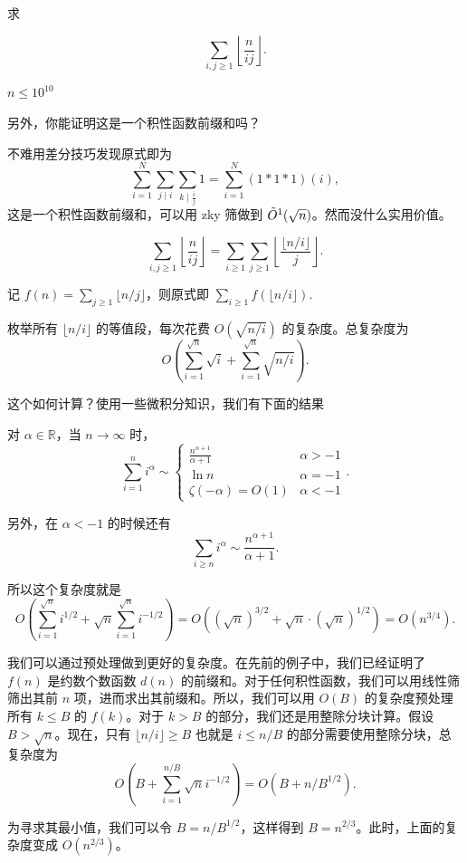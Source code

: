\begin{example}[整除分块的嵌套]
    求

    $$
    \sum_{i,j\ge 1}\left\lfloor\frac{n}{ij}\right\rfloor.
    $$

    $n\le 10^{10}$

    另外，你能证明这是一个积性函数前缀和吗？
\end{example}
\begin{remark}
    不难用差分技巧发现原式即为
    $$
    \sum_{i=1}^N\sum_{j\mid i}\sum_{k\mid \frac{i}{j}}1=\sum_{i=1}^N (1\ast 1\ast 1)(i),
    $$
    这是一个积性函数前缀和，可以用 zky 筛做到 $\tilde O\footnotemark(\sqrt{n})$。然而没什么实用价值。
\end{remark}
\begin{solution}
    $$
    \sum_{i,j\ge 1}\left\lfloor\frac{n}{ij}\right\rfloor=\sum_{i\ge 1}\sum_{j\ge 1}\left\lfloor\frac{\lfloor n/i\rfloor}{j}\right\rfloor.
    $$

    记 $f(n)=\sum_{j\ge 1}\lfloor n/j\rfloor$，则原式即 $\sum_{i\ge 1}f(\lfloor n/i\rfloor)$.

    枚举所有 $\lfloor n/i\rfloor$ 的等值段，每次花费 $O(\sqrt{n/i})$ 的复杂度。总复杂度为
    $$
    O\left(\sum_{i=1}^{\sqrt{n}}\sqrt{i}+\sum_{i=1}^{\sqrt{n}}\sqrt{n/i}\right).
    $$

    这个如何计算？使用一些微积分知识，我们有下面的结果
    \begin{lemma}
         对 $\alpha\in\mathbb R$，当 $n\to\infty$ 时，
        $$
        \sum_{i=1}^n i^{\alpha}\sim \begin{cases}\frac{n^{\alpha+1}}{\alpha+1}&\alpha>-1\\\ln n&\alpha=-1\\ \zeta(-\alpha)=O(1)&\alpha<-1\end{cases}.
        $$

        另外，在 $\alpha<-1$ 的时候还有
        $$
        \sum_{i\ge n}i^{\alpha}\sim \frac{n^{\alpha+1}}{\alpha+1}.
        $$
    \end{lemma}

    所以这个复杂度就是
    $$
    O\left(\sum_{i=1}^{\sqrt{n}}i^{1/2}+\sqrt{n}\sum_{i=1}^{\sqrt{n}}i^{-1/2}\right)=O((\sqrt{n})^{3/2}+\sqrt{n}\cdot(\sqrt{n})^{1/2})=O(n^{3/4}).
    $$
\end{solution}
\begin{solution}[更进一步]
    我们可以通过预处理做到更好的复杂度。在先前的例子中，我们已经证明了 $f(n)$ 是约数个数函数 $d(n)$ 的前缀和。对于任何积性函数，我们可以用线性筛筛出其前 $n$ 项，进而求出其前缀和。所以，我们可以用 $O(B)$ 的复杂度预处理所有 $k\le B$ 的 $f(k)$。对于 $k>B$ 的部分，我们还是用整除分块计算。假设 $B>\sqrt{n}$。现在，只有 $\lfloor n/i\rfloor \ge B$ 也就是 $i\le n/B$ 的部分需要使用整除分块，总复杂度为
    $$
    O\left(B+\sum_{i=1}^{n/B}\sqrt{n}i^{-1/2}\right)=O\left(B+n/B^{1/2}\right).
    $$

    为寻求其最小值，我们可以令 $B=n/B^{1/2}$，这样得到 $B=n^{2/3}$。此时，上面的复杂度变成 $O(n^{2/3})$。
\end{solution}

